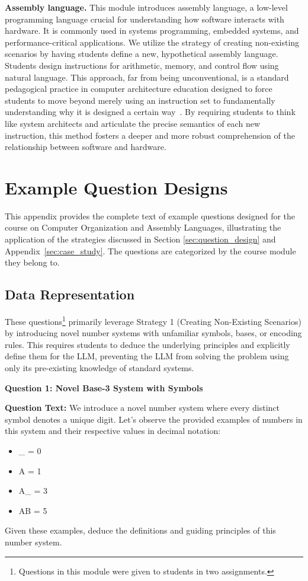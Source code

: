 \documentclass{article} %
\begin{document}
{\bf Assembly language.} This module introduces assembly language, a low-level programming language crucial for understanding how software interacts with hardware. It is commonly used in systems programming, embedded systems, and performance-critical applications. We utilize the strategy of creating non-existing scenarios by having students define a new, hypothetical assembly language. Students design instructions for arithmetic, memory, and control flow using natural language. This approach, far from being unconventional, is a standard pedagogical practice in computer architecture education designed to force students to move beyond merely using an instruction set to fundamentally understanding why it is designed a certain way~\citep{Patt2003ComputingSystems}. By requiring students to think like system architects and articulate the precise semantics of each new instruction, this method fosters a deeper and more robust comprehension of the relationship between software and hardware.




\section{Example Question Designs}
\label{sec:examples}

This appendix provides the complete text of example questions designed for the course on Computer Organization and Assembly Languages, illustrating the application of the strategies discussed in Section \ref{sec:question_design} and Appendix~\ref{sec:case_study}. The questions are categorized by the course module they belong to.

\subsection{Data Representation}
These questions\footnote{Questions in this module were given to students in two assignments.} primarily leverage {Strategy 1 (Creating Non-Existing Scenarios)} by introducing novel number systems with unfamiliar symbols, bases, or encoding rules. This requires students to deduce the underlying principles and explicitly define them for the LLM, preventing the LLM from solving the problem using only its pre-existing knowledge of standard systems.

\textbf{Question 1: Novel Base-3 System with Symbols}

\textbf{Question Text:} We introduce a novel number system where every distinct symbol denotes a unique digit. Let's observe the provided examples of numbers in this system and their respective values in decimal notation:
    \begin{itemize}
        \item \_ = 0
        \item A = 1
        \item A\_ = 3
        \item AB = 5
    \end{itemize}
    Given these examples, deduce the definitions and guiding principles of this number system.
\end{document}
